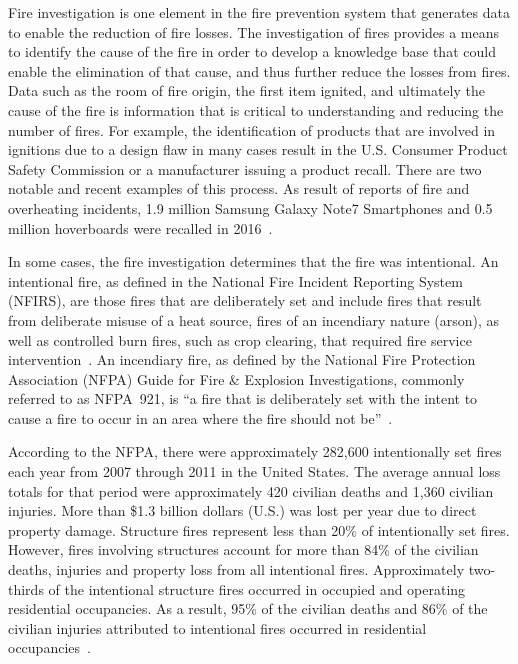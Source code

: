 \documentclass[twoside]{uocthesis}
\begin{document}
Fire investigation is one element in the fire prevention system that generates data to enable the reduction of fire losses.  The investigation of fires provides a means to identify the cause of the fire in order to develop a knowledge base that could enable the elimination of that cause, and thus further reduce the losses from fires.  Data such as the room of fire origin, the first item ignited, and ultimately the cause of the fire is information that is critical to understanding and reducing the number of fires.  For example, the identification of products that are involved in ignitions due to a design flaw in many cases result in the U.S. Consumer Product Safety Commission or a manufacturer issuing a product recall. There are two notable and recent examples of this process. As result of reports of fire and overheating incidents, 1.9 million Samsung Galaxy Note7 Smartphones and 0.5 million hoverboards were recalled in 2016~\cite{CPSC:Samsung,CPSC:Hoverboards}.  

In some cases, the fire investigation determines that the fire was intentional.  An intentional fire, as defined in the National Fire Incident Reporting System (NFIRS), are those fires that are deliberately set and include fires that result from deliberate misuse of a heat source, fires of an incendiary nature (arson), as well as controlled burn fires, such as crop clearing, that required fire service intervention~\cite{Campbell:2014}.  An incendiary fire, as defined by the National Fire Protection Association (NFPA) Guide for Fire \& Explosion Investigations, commonly referred to as NFPA~921, is ``a fire that is deliberately set with the intent to cause a fire to occur in an area where the fire should not be''~\cite{NFPA:921}.

According to the NFPA, there were approximately 282,600 intentionally set fires each year from 2007 through 2011 in the United States. The average annual loss totals for that period were approximately 420 civilian deaths and 1,360 civilian injuries. More than \$1.3 billion dollars (U.S.) was lost per year due to direct property damage. Structure fires represent less than 20\% of intentionally set fires.  However, fires involving structures account for more than 84\% of the civilian deaths, injuries and property loss from all intentional fires.  Approximately two-thirds of the intentional structure fires occurred in occupied and operating residential occupancies.  As a result, 95\% of the civilian deaths and 86\% of the civilian injuries attributed to intentional fires occurred in residential occupancies~\cite{Campbell:2014}.
\end{document}
